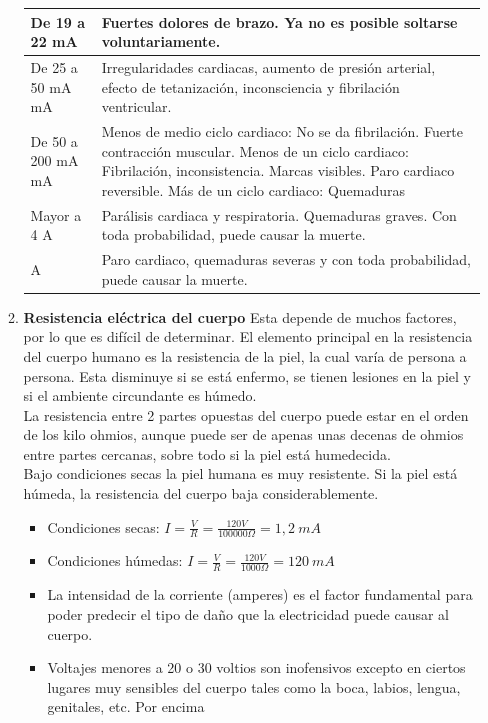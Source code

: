 \documentclass{report}
\begin{document}
\begin{itemize}
\begin{enumerate}
\begin{table}[H]
\begin{tabular}[t]{| >{\centering\arraybackslash}m{2cm} | >{\arraybackslash}m{8cm} |}
		\hline
		De 19 a 22 mA & Fuertes dolores de brazo. Ya no es posible soltarse
		voluntariamente. \\
		\hline
		De 25 a 50 mA mA & Irregularidades cardiacas, aumento de presión arterial,
		efecto de tetanización, inconsciencia y fibrilación ventricular. \\
		\hline
		De 50 a 200 mA mA & Menos de medio ciclo cardiaco: No se da fibrilación.
		Fuerte contracción muscular.
		Menos de un ciclo cardiaco: Fibrilación, inconsistencia.
		Marcas visibles. Paro cardiaco reversible.
		Más de un ciclo cardiaco: Quemaduras \\
		\hline
		Mayor a 4 A & Parálisis cardiaca y respiratoria. Quemaduras graves. Con
		toda probabilidad, puede causar la muerte. \\
		\hline
		10 A & Paro cardiaco, quemaduras severas y con toda probabilidad,
		puede causar la muerte. \\
		\hline
		\end{tabular}
\end{table}
\item \textbf{Resistencia eléctrica del cuerpo}
Esta depende de muchos factores, por lo que es difícil de determinar. El elemento
principal en la resistencia del cuerpo humano es la resistencia de la piel, la cual
varía de persona a persona. Esta disminuye si se está enfermo, se tienen lesiones
en la piel y si el ambiente circundante es húmedo.\\
La resistencia entre 2 partes opuestas del cuerpo puede estar en el orden de los
kilo ohmios, aunque puede ser de apenas unas decenas de ohmios entre partes
cercanas, sobre todo si la piel está humedecida.\\
Bajo condiciones secas la piel humana es muy resistente. Si la piel está húmeda,
la resistencia del cuerpo baja considerablemente.
\begin{itemize}
\item Condiciones secas: $I=\frac{V}{R}=\frac{120 V}{100000 \Omega}=1,2 \ mA$\\
\item Condiciones húmedas: $I=\frac{V}{R}=\frac{120 V}{1000 \Omega}=120 \ mA$\\
\item La intensidad de la corriente (amperes) es el factor fundamental para poder
predecir el tipo de daño que la electricidad puede causar al cuerpo.
\item Voltajes menores a 20 o 30 voltios son inofensivos excepto en ciertos lugares muy
sensibles del cuerpo tales como la boca, labios, lengua, genitales, etc. Por encima

\end{itemize}
\end{enumerate}
\end{itemize}
\end{document}
